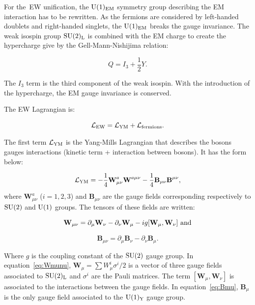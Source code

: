     For the~\gls{EW} unification, the $\rm{U}(1)_{\rm{EM}}$ symmetry group describing  the \gls{EM} interaction has to be rewritten.
    As the fermions are considered by left-handed doublets and right-handed singlets, the $\rm{U}(1)_{\rm{EM}}$ breaks the gauge invariance.
    The weak isospin group $\rm{SU}(2)_{\rm{L}}$ is combined with the EM charge to create the hypercharge give by the Gell-Mann-Nishijima relation: 
  
    \begin{equation}
      Q = I_3 + \frac{1}{2}Y.
    \end{equation}
   
    The $I_3$ term is the third component of the weak isospin.
    With the introduction of the hypercharge, the EM gauge invariance is conserved.

    The \gls{EW} Lagrangian is:

    \begin{equation}
      \mathcal{L}_{\rm{EW}} = \mathcal{L}_{\rm{YM}} + \mathcal{L}_{\rm{fermions}}.
      \label{eq:ewLag}
    \end{equation}

    The first term $\mathcal{L}_{\rm{YM}}$ is the Yang-Mills Lagrangian that describes the bosons gauges interactions (kinetic term + interaction between bosons). 
    It has the form below:

    \begin{equation}
      \mathcal{L}_{\rm{YM}} = - \frac{1}{4}\textbf{W}^a_{\mu\nu} \textbf{W}^{a\mu\nu} - \frac{1}{4}\textbf{B}_{\mu\nu}\textbf{B}^{\mu\nu},
    \end{equation}
    where $\textbf{W}^{a}_{\mu\nu}$ ($i=1,2,3$) and $\textbf{B}_{\mu\nu}$ are the gauge fields corresponding respectively to $\rm{SU}(2)$ and $\rm{U}(1)$ groups.
    The tensors of these fields are written:

    \begin{equation}
        \textbf{W}_{\mu\nu}  =  \partial_{\mu}\textbf{W}_{\nu} - \partial_{\nu}\textbf{W}_{\mu} - i g [\textbf{W}_{\mu},\textbf{W}_{\nu}]~\rm{and}
      \label{eq:Wmunu}
    \end{equation}

    \begin{equation}
        \textbf{B}_{\mu\nu}  =  \partial_{\mu}\textbf{B}_{\nu} - \partial_{\nu}\textbf{B}_{\mu}.
        \label{eq:Bmu}
    \end{equation}
   
    Where $g$ is the coupling constant of the $\rm{SU}(2)$ gauge group. 
    In equation~\ref{eq:Wmunu}, $\textbf{W}_{\mu} = \sum W^i_{\mu}\sigma^i/2$ is a vector of three gauge fields associated to $\rm{SU}(2)_{\rm{L}}$ and $\sigma^i$ are the Pauli matrices. 
    The term $[\textbf{W}_{\mu},\textbf{W}_{\nu}]$ is associated to the interactions between the gauge fields.
    In equation~\ref{eq:Bmu}, $\textbf{B}_{\mu}$ is the only gauge field associated to the $\rm{U}(1)_{\rm{Y}}$ gauge group.

